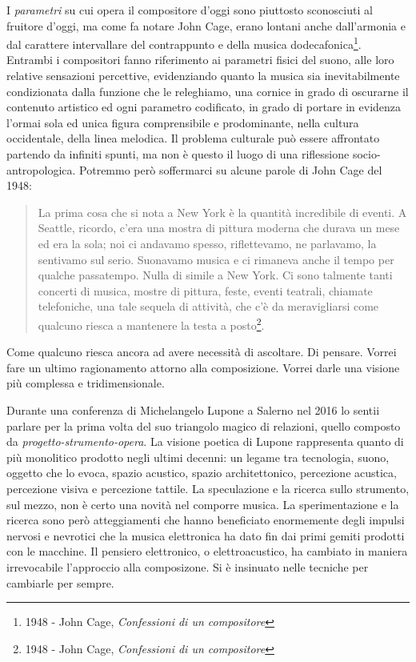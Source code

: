 I \emph{parametri} su cui opera il compositore d'oggi sono piuttosto sconosciuti
al fruitore d'oggi, ma come fa notare John Cage, erano lontani anche dall'armonia
e dal carattere intervallare del contrappunto e della musica
dodecafonica\footnote{1948 - John Cage, \emph{Confessioni di un compositore}}.
Entrambi i compositori fanno riferimento ai parametri fisici del suono, alle loro
relative sensazioni percettive, evidenziando quanto la musica sia inevitabilmente
condizionata dalla funzione che le releghiamo, una cornice in grado di oscurarne
il contenuto artistico ed ogni parametro codificato, in grado di portare in evidenza l'ormai sola ed unica
figura comprensibile e prodominante, nella cultura occidentale, della linea melodica.
Il problema culturale può essere affrontato partendo da infiniti spunti,
ma non è questo il luogo di una riflessione socio-antropologica. Potremmo
però soffermarci su alcune parole di John Cage del 1948:

\begin{quote}
  La prima cosa che si nota a New York è la quantità incredibile di eventi. A
  Seattle, ricordo, c'era una mostra di pittura moderna che durava un mese ed
  era la sola; noi ci andavamo spesso, riflettevamo, ne parlavamo, la sentivamo
  sul serio. Suonavamo musica e ci rimaneva anche il tempo per qualche passatempo.
  Nulla di simile a New York. Ci sono talmente tanti concerti di musica, mostre
  di pittura, feste, eventi teatrali, chiamate telefoniche, una tale sequela di attività,
  che c'è da meravigliarsi come qualcuno riesca a mantenere la testa a posto\footnote{1948 -
	John Cage, \emph{Confessioni di un compositore}}.
\end{quote}


Come qualcuno riesca ancora ad avere necessità di ascoltare. Di pensare. Vorrei
fare un ultimo ragionamento attorno alla composizione. Vorrei darle una
visione più complessa e tridimensionale.

Durante una conferenza di Michelangelo Lupone a
Salerno nel 2016 lo sentii parlare per la prima volta del suo triangolo magico
di relazioni, quello composto da \emph{progetto-strumento-opera}. La visione
poetica di Lupone rappresenta quanto di più monolitico prodotto negli ultimi
decenni: un legame tra tecnologia, suono, oggetto che lo evoca, spazio acustico, spazio
architettonico, percezione acustica, percezione visiva e percezione tattile.
La speculazione e la ricerca sullo strumento, sul mezzo, non è certo una novità
nel comporre musica. La sperimentazione e la ricerca sono però atteggiamenti che hanno
beneficiato enormemente degli impulsi nervosi e nevrotici che la musica elettronica
ha dato fin dai primi gemiti prodotti con le macchine. Il pensiero elettronico, o
elettroacustico, ha cambiato in maniera irrevocabile l'approccio alla composizone.
Si è insinuato nelle tecniche per cambiarle per sempre.

